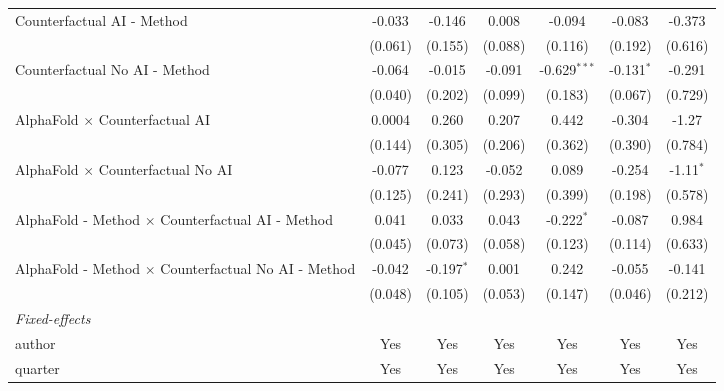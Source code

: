 \begin{tabular}{lcccccc}
   Counterfactual AI - Method                                 & -0.033      & -0.146       & 0.008   & -0.094         & -0.083       & -0.373\\   
                                                              & (0.061)     & (0.155)      & (0.088) & (0.116)        & (0.192)      & (0.616)\\   
   Counterfactual No AI - Method                              & -0.064      & -0.015       & -0.091  & -0.629$^{***}$ & -0.131$^{*}$ & -0.291\\   
                                                              & (0.040)     & (0.202)      & (0.099) & (0.183)        & (0.067)      & (0.729)\\   
   AlphaFold $\times$ Counterfactual AI                       & 0.0004      & 0.260        & 0.207   & 0.442          & -0.304       & -1.27\\   
                                                              & (0.144)     & (0.305)      & (0.206) & (0.362)        & (0.390)      & (0.784)\\   
   AlphaFold $\times$ Counterfactual No AI                    & -0.077      & 0.123        & -0.052  & 0.089          & -0.254       & -1.11$^{*}$\\   
                                                              & (0.125)     & (0.241)      & (0.293) & (0.399)        & (0.198)      & (0.578)\\   
   AlphaFold - Method $\times$ Counterfactual AI - Method     & 0.041       & 0.033        & 0.043   & -0.222$^{*}$   & -0.087       & 0.984\\   
                                                              & (0.045)     & (0.073)      & (0.058) & (0.123)        & (0.114)      & (0.633)\\   
   AlphaFold - Method $\times$ Counterfactual No AI - Method  & -0.042      & -0.197$^{*}$ & 0.001   & 0.242          & -0.055       & -0.141\\   
                                                              & (0.048)     & (0.105)      & (0.053) & (0.147)        & (0.046)      & (0.212)\\   
   \midrule
   \emph{Fixed-effects}\\
   author                                                     & Yes         & Yes          & Yes     & Yes            & Yes          & Yes\\  
   quarter                                                    & Yes         & Yes          & Yes     & Yes            & Yes          & Yes\\  

\end{tabular}
